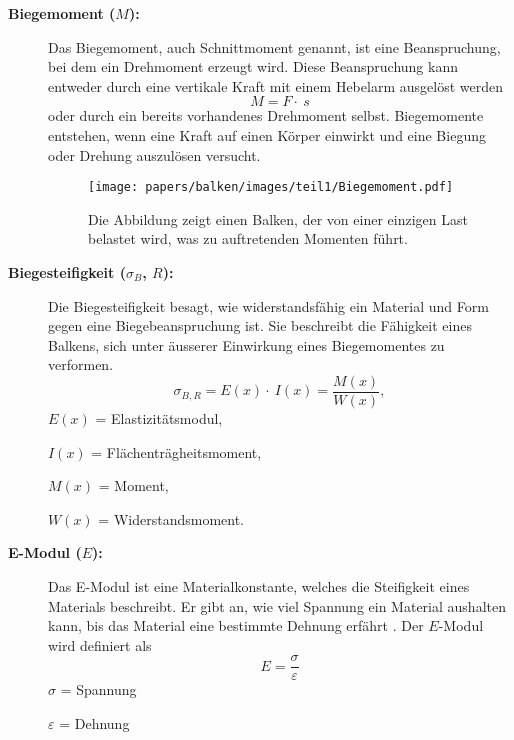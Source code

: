 \begin{description}
\item[\textbf{Biegemoment ($M$):}] Das Biegemoment, auch Schnittmoment genannt, ist eine Beanspruchung, bei dem ein Drehmoment erzeugt wird.
Diese Beanspruchung kann entweder durch eine vertikale Kraft mit einem Hebelarm ausgelöst werden
\begin{equation*}
	M=
	F\cdot\ s
\end{equation*}
oder durch ein bereits vorhandenes Drehmoment selbst.
Biegemomente entstehen, wenn eine Kraft auf einen Körper einwirkt und eine Biegung oder Drehung auszulösen versucht.
\begin{figure}
	\centering
	\texttt{[image: papers/balken/images/teil1/Biegemoment.pdf]}
	\caption{Die Abbildung zeigt einen Balken, der von einer einzigen Last belastet wird, was zu auftretenden Momenten führt.}
	\label{fig:Die Abbildung zeigt einen Balken, der von einer einzigen Last belastet wird, was zu auftretenden Momenten führt.}
\end{figure}

\item[\textbf{Biegesteifigkeit ($σ_B$, $R$):}] Die Biegesteifigkeit besagt, wie widerstandsfähig ein Material und Form gegen eine Biegebeanspruchung ist.
%
Sie beschreibt die Fähigkeit eines Balkens, sich unter äusserer Einwirkung eines Biegemomentes zu verformen.
\begin{equation*}
\sigma_{B,R}=E
\left(x\right)\cdot\ I\left(x\right)=
\frac{M(x)}{W(x)},
\end{equation*}
$E(x)$ = Elastizitätsmodul,

$I(x)$ = Flächenträgheitsmoment,

$M(x)$ = Moment,

$W(x)$ = Widerstandsmoment.

\item[\textbf{E-Modul ($E$):}] Das E-Modul ist eine Materialkonstante, welches die Steifigkeit eines Materials beschreibt.
%
Er gibt an, wie viel Spannung ein Material aushalten kann, bis das Material eine bestimmte Dehnung erfährt \cite{balken:Elastizitaetsmodul}.
Der $E$-Modul wird definiert als
\begin{equation*}
E=
\frac{\sigma}{\varepsilon}
\end{equation*}
$\sigma$ = Spannung

$\varepsilon$ = Dehnung


\end{description}

